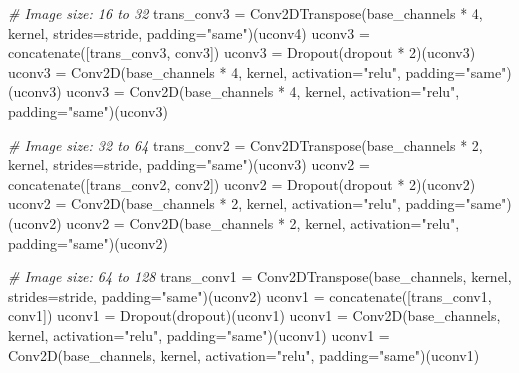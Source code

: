 \documentclass[11pt]{article}
\newenvironment{Shaded}{}{}
\newcommand{\DecValTok}[1]{\textcolor[rgb]{0.25,0.63,0.44}{{#1}}}
\newcommand{\StringTok}[1]{\textcolor[rgb]{0.25,0.44,0.63}{{#1}}}
\newcommand{\CommentTok}[1]{\textcolor[rgb]{0.38,0.63,0.69}{\textit{{#1}}}}
\newcommand{\NormalTok}[1]{{#1}}
\newcommand{\OperatorTok}[1]{\textcolor[rgb]{0.40,0.40,0.40}{{#1}}}
\begin{document}
\begin{Shaded}
\begin{Highlighting}[]
    \CommentTok{# Image size: 16 to 32}
\NormalTok{    trans_conv3 }\OperatorTok{=}\NormalTok{ Conv2DTranspose(base_channels }\OperatorTok{*} \DecValTok{4}\NormalTok{, kernel, strides}\OperatorTok{=}\NormalTok{stride, padding}\OperatorTok{=}\StringTok{"same"}\NormalTok{)(uconv4)}
\NormalTok{    uconv3 }\OperatorTok{=}\NormalTok{ concatenate([trans_conv3, conv3])}
\NormalTok{    uconv3 }\OperatorTok{=}\NormalTok{ Dropout(dropout }\OperatorTok{*} \DecValTok{2}\NormalTok{)(uconv3)}
\NormalTok{    uconv3 }\OperatorTok{=}\NormalTok{ Conv2D(base_channels }\OperatorTok{*} \DecValTok{4}\NormalTok{, kernel, activation}\OperatorTok{=}\StringTok{"relu"}\NormalTok{, padding}\OperatorTok{=}\StringTok{"same"}\NormalTok{)(uconv3)}
\NormalTok{    uconv3 }\OperatorTok{=}\NormalTok{ Conv2D(base_channels }\OperatorTok{*} \DecValTok{4}\NormalTok{, kernel, activation}\OperatorTok{=}\StringTok{"relu"}\NormalTok{, padding}\OperatorTok{=}\StringTok{"same"}\NormalTok{)(uconv3)}

    \CommentTok{# Image size: 32 to 64}
\NormalTok{    trans_conv2 }\OperatorTok{=}\NormalTok{ Conv2DTranspose(base_channels }\OperatorTok{*} \DecValTok{2}\NormalTok{, kernel, strides}\OperatorTok{=}\NormalTok{stride, padding}\OperatorTok{=}\StringTok{"same"}\NormalTok{)(uconv3)}
\NormalTok{    uconv2 }\OperatorTok{=}\NormalTok{ concatenate([trans_conv2, conv2])}
\NormalTok{    uconv2 }\OperatorTok{=}\NormalTok{ Dropout(dropout }\OperatorTok{*} \DecValTok{2}\NormalTok{)(uconv2)}
\NormalTok{    uconv2 }\OperatorTok{=}\NormalTok{ Conv2D(base_channels }\OperatorTok{*} \DecValTok{2}\NormalTok{, kernel, activation}\OperatorTok{=}\StringTok{"relu"}\NormalTok{, padding}\OperatorTok{=}\StringTok{"same"}\NormalTok{)(uconv2)}
\NormalTok{    uconv2 }\OperatorTok{=}\NormalTok{ Conv2D(base_channels }\OperatorTok{*} \DecValTok{2}\NormalTok{, kernel, activation}\OperatorTok{=}\StringTok{"relu"}\NormalTok{, padding}\OperatorTok{=}\StringTok{"same"}\NormalTok{)(uconv2)}

    \CommentTok{# Image size: 64 to 128}
\NormalTok{    trans_conv1 }\OperatorTok{=}\NormalTok{ Conv2DTranspose(base_channels, kernel, strides}\OperatorTok{=}\NormalTok{stride, padding}\OperatorTok{=}\StringTok{"same"}\NormalTok{)(uconv2)}
\NormalTok{    uconv1 }\OperatorTok{=}\NormalTok{ concatenate([trans_conv1, conv1])}
\NormalTok{    uconv1 }\OperatorTok{=}\NormalTok{ Dropout(dropout)(uconv1)}
\NormalTok{    uconv1 }\OperatorTok{=}\NormalTok{ Conv2D(base_channels, kernel, activation}\OperatorTok{=}\StringTok{"relu"}\NormalTok{, padding}\OperatorTok{=}\StringTok{"same"}\NormalTok{)(uconv1)}
\NormalTok{    uconv1 }\OperatorTok{=}\NormalTok{ Conv2D(base_channels, kernel, activation}\OperatorTok{=}\StringTok{"relu"}\NormalTok{, padding}\OperatorTok{=}\StringTok{"same"}\NormalTok{)(uconv1)}


\end{Highlighting}
\end{Shaded}
\end{document}
